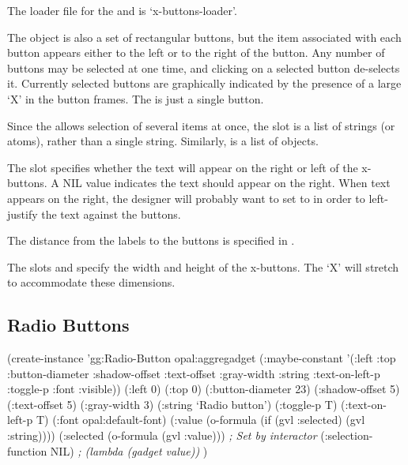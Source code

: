 \vspace{1 line}
The loader file for the  and  is
`x-buttons-loader'.

The  object is also a set of rectangular buttons,
but the item associated with each button appears either to the left or
to the right of the button.  Any number of buttons may be selected at
one time, and clicking on a selected button de-selects it.  Currently
selected buttons are graphically indicated by the presence of a large
`X' in the button frames.  The  is just a single button.

Since the  allows selection of several items at
once, the  slot is a list of strings (or atoms), rather
than a single string.  Similarly,  is a list of
objects.

The slot  specifies whether the text will appear
on the right or left of the x-buttons.  A NIL value indicates the text
should appear on the right.  When text appears on the right, the designer
will probably want to set  to  in order to left-justify
the text against the buttons.

The distance from the labels to the buttons is specified in
.

The slots  and  specify the width
and height of the x-buttons.  The `X' will stretch to accommodate
these dimensions.

\begin{group}
\subsection{Radio Buttons}
\label{radio-buttons}
\begin{programexample}
(create-instance 'gg:Radio-Button opal:aggregadget
   (:maybe-constant '(:left :top :button-diameter :shadow-offset :text-offset
                      :gray-width :string :text-on-left-p :toggle-p :font :visible))
   (:left 0) (:top 0)
   (:button-diameter 23)
   (:shadow-offset 5) (:text-offset 5) (:gray-width 3)
   (:string `Radio button')
   (:toggle-p T)
   (:text-on-left-p T)
   (:font opal:default-font)
   (:value (o-formula (if (gvl :selected) (gvl :string))))
   (:selected (o-formula (gvl :value))) {\it ; Set by interactor}
   (:selection-function NIL)            {\it ; (lambda (gadget value))}
   )
\end{programexample}
\end{group}
\vspace{1 line}

